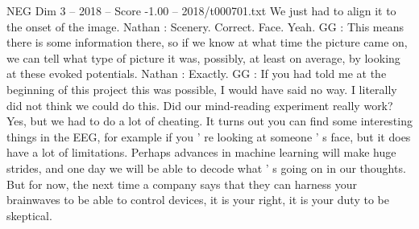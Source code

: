 \begin{textsample}{NEG Dim 3 – 2018 – Score -1.00 – 2018/t000701.txt}
We just had to align it to the onset of the image.
Nathan : Scenery.
Correct.
Face.
Yeah.
GG : This means there is some information there, so if we know at what time the picture came on, we can tell what type of picture it was, possibly, at least on average, by looking at these evoked potentials.
Nathan : Exactly.
GG : If you had told me at the beginning of this project this was possible, I would have said no way.
I literally did not think we could do this.
Did our mind-reading experiment really work?
Yes, but we had to do a lot of cheating.
It turns out you can find some interesting things in the EEG, for example if you ' re looking at someone ' s face, but it does have a lot of limitations.
Perhaps advances in machine learning will make huge strides, and one day we will be able to decode what ' s going on in our thoughts.
But for now, the next time a company says that they can harness your brainwaves to be able to control devices, it is your right, it is your duty to be skeptical.

\end{textsample}
